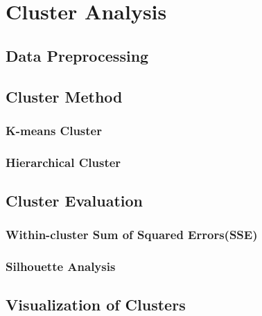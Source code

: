 
\chapter{Cluster Analysis}



\section{Data Preprocessing}


\section{Cluster Method}

\subsection{K-means Cluster}

\subsection{Hierarchical Cluster}

\section{Cluster Evaluation}

\subsection{Within-cluster Sum of Squared Errors(SSE)}

\subsection{Silhouette Analysis}

\section{Visualization of Clusters}